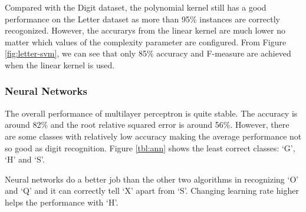 \documentclass[11pt]{article}
\begin{document}
Compared with the Digit dataset, the polynomial kernel still has a good performance on the Letter dataset as more than 95\% instances are correctly recogonized. However, the accurarys from the linear kernel are much lower no matter which values of the complexity parameter are configured. From Figure \ref{fig:letter-svm}, we can see that only 85\% accuracy and F-measure are achieved when the linear kernel is used. 


\subsubsection{Neural Networks}
The overall performance of multilayer perceptron is quite stable. The accuracy is around 82\% and the root relative squared error is around 56\%. However, there are some classes with relatively low accuracy making the average performance not so good as digit recognition. Figure \ref{tbl:ann} shows the least correct classes: `G', `H' and `S'.

Neural networks do a better job than the other two algorithms in recognizing `O' and `Q' and it can correctly tell `X' apart from `S'. Changing learning rate higher helps the performance with `H'.
\end{document}
